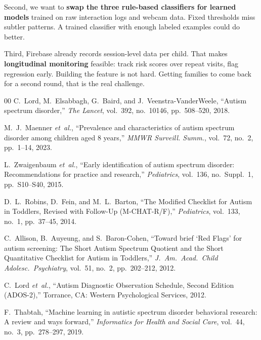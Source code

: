 \documentclass[conference]{IEEEtran}
\begin{document}
Second, we want to \textbf{swap the three rule-based classifiers for learned models} trained on raw interaction logs and webcam data. Fixed thresholds miss subtler patterns. A trained classifier with enough labeled examples could do better.

Third, Firebase already records session-level data per child. That makes \textbf{longitudinal monitoring} feasible: track risk scores over repeat visits, flag regression early. Building the feature is not hard. Getting families to come back for a second round, that is the real challenge.

\begin{thebibliography}{00}
C.~Lord, M.~Elsabbagh, G.~Baird, and J.~Veenstra-VanderWeele, ``Autism spectrum disorder,'' \textit{The Lancet}, vol.~392, no.~10146, pp.~508--520, 2018.

M.~J.~Maenner \textit{et~al.}, ``Prevalence and characteristics of autism spectrum disorder among children aged 8 years,'' \textit{MMWR Surveill. Summ.}, vol.~72, no.~2, pp.~1--14, 2023.

L.~Zwaigenbaum \textit{et~al.}, ``Early identification of autism spectrum disorder: Recommendations for practice and research,'' \textit{Pediatrics}, vol.~136, no.~Suppl.~1, pp.~S10--S40, 2015.

D.~L.~Robins, D.~Fein, and M.~L.~Barton, ``The Modified Checklist for Autism in Toddlers, Revised with Follow-Up (M-CHAT-R/F),'' \textit{Pediatrics}, vol.~133, no.~1, pp.~37--45, 2014.

C.~Allison, B.~Auyeung, and S.~Baron-Cohen, ``Toward brief `Red Flags' for autism screening: The Short Autism Spectrum Quotient and the Short Quantitative Checklist for Autism in Toddlers,'' \textit{J.~Am.~Acad.~Child Adolesc.~Psychiatry}, vol.~51, no.~2, pp.~202--212, 2012.

C.~Lord \textit{et~al.}, ``Autism Diagnostic Observation Schedule, Second Edition (ADOS-2),'' Torrance, CA: Western Psychological Services, 2012.

F.~Thabtah, ``Machine learning in autistic spectrum disorder behavioral research: A review and ways forward,'' \textit{Informatics for Health and Social Care}, vol.~44, no.~3, pp.~278--297, 2019.


\end{thebibliography}
\end{document}
